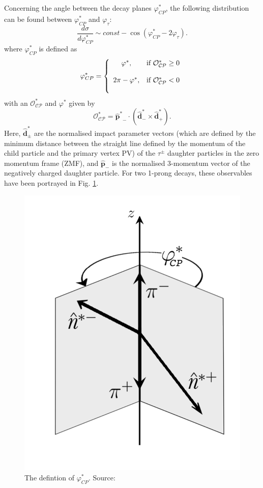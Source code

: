 Concerning the angle between the decay planes $\varphi_{CP}^*$, the following distribution can be found between $\varphi_{CP}^*$ and $\varphi_\tau$:
\begin{equation}
	\label{eq:CP_Star_Distribution}
	\frac{d\sigma}{d\varphi_{CP}^*} \sim const - \cos(\varphi_{CP}^*-2\varphi_\tau).
\end{equation}
where $\varphi_{CP}^*$ is defined as
\begin{equation}
	\varphi_{CP}^* = \left\lbrace\begin{array}{cc}
	\varphi^*, \bigskip &\text{if } \mathcal{O_{CP}^*}\geq 0\\
	2\pi-\varphi^*, \bigskip &\text{if } \mathcal{O_{CP}^*}< 0
	\end{array}\right.
\end{equation}
with an $\mathcal{O_{CP}^*}$ and $\varphi^*$ given by
\begin{equation}
	\mathcal{O_{CP}^*} = \boldsymbol{\hat{p}^*}_- \cdot (\boldsymbol{\hat{d}}_-^*\times\boldsymbol{\hat{d}}_+^*).
\end{equation}
Here, $\boldsymbol{\hat{d}_\pm^*}$ are the normalised impact parameter vectors (which are defined by the minimum distance between the straight line defined by the momentum of the child particle and the primary vertex PV) of the $\tau^\pm$ daughter particles in the zero momentum frame (ZMF), and $\boldsymbol{\hat{p}}_-$ is the normalised 3-momentum vector of the negatively charged daughter particle. For two 1-prong decays, these observables have been portrayed in Fig. \ref{fig:decayplanesphistar}.\\
\begin{figure}[h]
	\centering
	\includegraphics[width=0.4\linewidth]{Figures/decay_planes_phi_Star}
	\caption{The defintion of $\varphi_{CP}^*$. Source: \parencite{Berge_CP_Prospects}}
	\label{fig:decayplanesphistar}
\end{figure}\\
